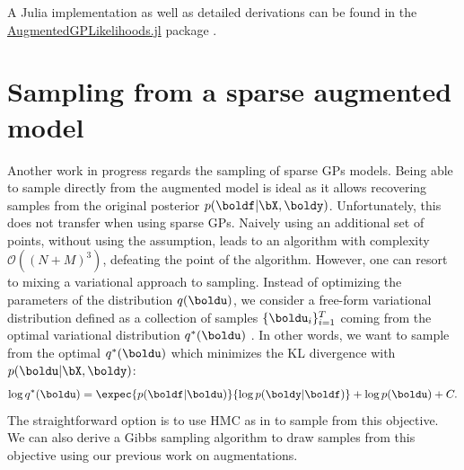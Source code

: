 A Julia implementation as well as detailed derivations can be found in the \href{https://github.com/JuliaGaussianProcesses/AugmentedGPLikelihoods.jl}{AugmentedGPLikelihoods.jl} package \cite{theo_galy_fajou_2022_6347022}.

\section{Sampling from a sparse augmented model}

Another work in progress regards the sampling of sparse \ac{GPs} models.
Being able to sample directly from the augmented model is ideal as it allows recovering samples from the original posterior $p(\boldf|\bX,\boldy)$.
Unfortunately, this does not transfer when using sparse \ac{GPs}.
Naively using an additional set of points, without using the \citet{Titsias2009} assumption, leads to an algorithm with complexity $\mathcal{O}((N+M)^3)$, defeating the point of the algorithm.
However, one can resort to mixing a variational approach to sampling.
Instead of optimizing the parameters of the distribution $q(\boldu)$, we consider a free-form variational distribution defined as a collection of samples $\{\boldu_i\}_{i=1}^T$ coming from the optimal variational distribution $q^*(\boldu)$ \cite{hensmanMCMCVariationallySparse2015}.
In other words, we want to sample from the optimal $q^*(\boldu)$ which minimizes the \ac{KL} divergence with $p(\boldu|\bX,\boldy)$:
\begin{align*}
    \log q^*(\boldu) = \expec{p(\boldf|\boldu)}{\log p(\boldy|\boldf)} + \log p(\boldu) + C.
\end{align*}
The straightforward option is to use \ac{HMC} as in \cite{hensmanMCMCVariationallySparse2015} to sample from this objective.
We can also derive a Gibbs sampling algorithm to draw samples from this objective using our previous work on augmentations.

